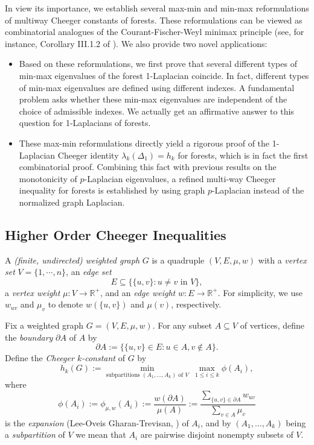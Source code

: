 \documentclass[12pt, reqno]{article}
\newcommand{\R}{\mathbb{R}}
\begin{document}
In view its importance, we establish several max-min and min-max reformulations of multiway Cheeger constants of forests. These reformulations can be viewed as combinatorial analogues of the Courant-Fischer-Weyl minimax principle (see, for instance, Corollary III.1.2 of \cite{Bhatia}). We also provide two novel applications:
\begin{itemize}
\item Based on these reformulations, we first prove that several different types of min-max eigenvalues of the forest 1-Laplacian coincide. In fact, different types of min-max eigenvalues are defined using different indexes. A fundamental problem asks whether these min-max eigenvalues are independent of the choice of admissible indexes. We actually get an affirmative answer to this question for 1-Laplacians of forests. 
\item These max-min reformulations directly yield a rigorous proof of the 1-Laplacian Cheeger identity $\lambda_k(\Delta_1)=h_k$ for forests, which is in fact the first combinatorial proof. Combining this fact with previous results on the monotonicity of $p$-Laplacian eigenvalues, a refined multi-way Cheeger inequality for forests is established by using graph $p$-Laplacian instead of the normalized graph Laplacian. 
\end{itemize}

\subsection{%
Higher Order Cheeger Inequalities}
A \emph{(finite, undirected) weighted graph} $G$ is a quadruple $(V,E,\mu,w)$ with a \emph{vertex set} $V=\{1,\cdots,n\}$, an \emph{edge set} \[E\subseteq\{\{u,v\}:u\ne v\text{ in }V\},\] a \emph{vertex weight} $\mu:V\to \mathbb{R}^+$, and an \emph{edge weight} $w:E\to \R^+$. For simplicity, we use $w_{uv}$ and $\mu_v$ to denote $w(\{u,v\})$ and $\mu(v)$, respectively. 

Fix a weighted graph $G=(V,E,\mu,w)$. For any subset $A\subseteq V$ of vertices, define the \emph{boundary} $\partial A$ of $A$ by \[\partial A:=\{\{u,v\}\in E\colon u\in A, v\not\in A\}.\] Define the \emph{Cheeger $k$-constant} of $G$ by \[h_k(G):=\min_{\text{subpartitions }(A_1,\dots,A_k)\text{ of }V}~\max_{1\le i\le k}\phi(A_i),\] where \[\phi(A_i):=\phi_{\mu,w}(A_i):=\frac{w(\partial A)}{\mu(A)}:=\frac{\sum\limits_{\{u,v\}\in\partial A}w_{uv}}{\sum\limits_{v\in A}\mu_v}\] is the \textsl{expansion} (Lee-Oveis Gharan-Trevisan, \cite{Lee-Gharan-Trevisan}) of $A_i$, and by $(A_1,\dots,A_k)$ being a \emph{subpartition} of $V$ we mean that $A_i$ are pairwise disjoint nonempty subsets of $V$. 
\end{document}
